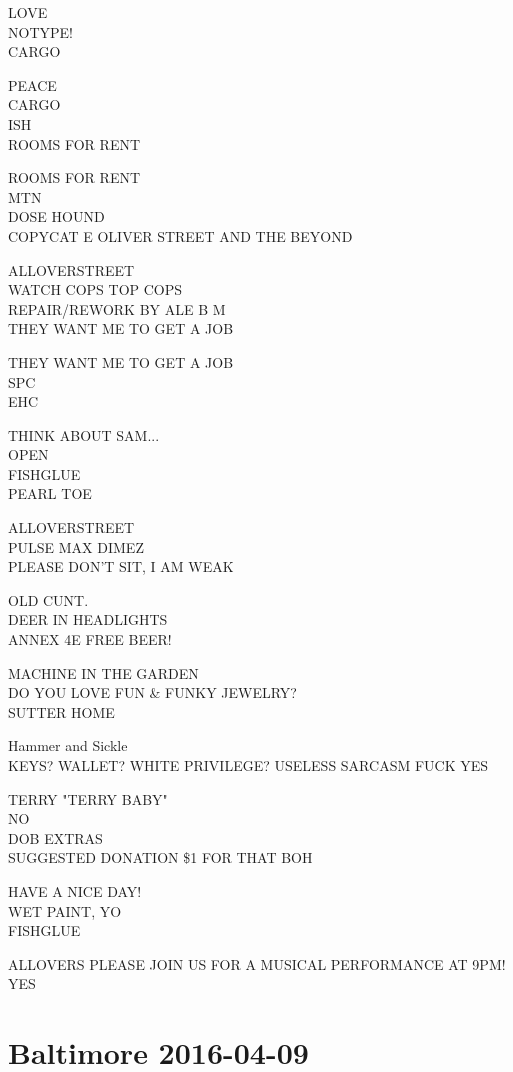 \documentclass[10pt,letterpaper]{article}
\begin{document}
LOVE\\
NOTYPE!\\
CARGO

PEACE\\
CARGO\\
ISH\\
ROOMS FOR RENT

ROOMS FOR RENT\\
MTN\\
DOSE HOUND\\
COPYCAT E OLIVER STREET AND THE BEYOND

ALLOVERSTREET\\
WATCH COPS TOP COPS\\
REPAIR/REWORK BY ALE B M\\
THEY WANT ME TO GET A JOB

THEY WANT ME TO GET A JOB\\
SPC\\
EHC

THINK ABOUT SAM...\\
OPEN\\
FISHGLUE\\
PEARL TOE

ALLOVERSTREET\\
PULSE MAX DIMEZ\\
PLEASE DON'T SIT, I AM WEAK

OLD CUNT.\\
DEER IN HEADLIGHTS\\
ANNEX 4E FREE BEER!

MACHINE IN THE GARDEN\\
DO YOU LOVE FUN \& FUNKY JEWELRY?\\
SUTTER HOME

Hammer and Sickle\\
KEYS?  WALLET?  WHITE PRIVILEGE?  USELESS SARCASM FUCK YES

TERRY "TERRY BABY"\\
NO\\
DOB EXTRAS\\
SUGGESTED DONATION \$1 FOR THAT BOH

HAVE A NICE DAY!\\
WET PAINT, YO\\
FISHGLUE

ALLOVERS PLEASE JOIN US FOR A MUSICAL PERFORMANCE AT 9PM!\\
YES
\

\section*{Baltimore 2016-04-09}
\end{document}
